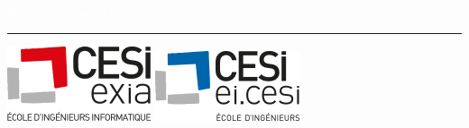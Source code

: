 \documentclass[letterpaper]{article}
\author{%
    Tanguy Blochet \
    Project Manager \
    \texttt{tanguy.blochet@viacesi.fr}\vspace{40pt} \
    Baptiste Saclier \
    Web developer \
    \texttt{baptiste.saclier@viacesi.fr}\vspace{40pt} \      
    Romain Junca \     
    Web developer \       
    \texttt{romain.junca@viacesi.fr}
    }
\makeatletter
\def\printauthor{%
    {\large \@author}}
\makeatother
\begin{document}
\renewcommand{\abstractname}{Abstract}
\renewcommand\contentsname{Table of Contents}
\renewcommand\contentsname{Table of Contents}
\renewcommand\listfigurename{Table of Figures}
\begin{titlepage}
	\BgThispage
	\vspace*{2cm}
	\noindent
	\hspace{1cm}
	\textcolor{white}{\bigsf Student Union Website}
	\vspace*{3cm}\par
	\noindent
	\begin{minipage}{0.35\linewidth}
	    \begin{flushright}
	        \printauthor
	    \end{flushright}
	\end{minipage} \hspace{15pt}
	\begin{minipage}{0.02\linewidth}
	    \rule{1pt}{175pt}
	\end{minipage} \hspace{-10pt}
	\begin{minipage}{0.8\linewidth}
		\begin{center}
			\hspace{1cm}
				\includegraphics[scale=0.6]{img/logo_Exia.png}
				\hspace{20pt}
				\includegraphics[scale=0.6]{img/logo_EI.png.png}
				

\end{center}
\end{minipage}
\end{titlepage}
\end{document}
